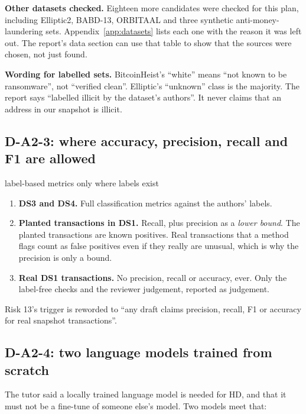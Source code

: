 \textbf{Other datasets checked.} Eighteen more candidates were checked for this plan, including
Elliptic2, BABD-13, ORBITAAL and three synthetic anti-money-laundering sets.
Appendix~\ref{app:datasets} lists each one with the reason it was left out. The report's data
section can use that table to show that the sources were chosen, not just found.

\textbf{Wording for labelled sets.} BitcoinHeist's ``white'' means ``not known to be ransomware'',
not ``verified clean''. Elliptic's ``unknown'' class is the majority. The report says ``labelled
illicit by the dataset's authors''. It never claims that an address in our snapshot is illicit.

\subsection{D-A2-3: where accuracy, precision, recall and F1 are allowed}
\label{sec:metricsrule}

\begin{decision}{label-based metrics only where labels exist}
\begin{enumerate}[leftmargin=*]
  \item \textbf{DS3 and DS4.} Full classification metrics against the authors' labels.
  \item \textbf{Planted transactions in DS1.} Recall, plus precision as a \emph{lower bound}. The
    planted transactions are known positives. Real transactions that a method flags count as
    false positives even if they really are unusual, which is why the precision is only a bound.
  \item \textbf{Real DS1 transactions.} No precision, recall or accuracy, ever. Only the
    label-free checks and the reviewer judgement, reported as judgement.
\end{enumerate}
Risk 13's trigger is reworded to ``any draft claims precision, recall, F1 or accuracy for real
snapshot transactions''.
\end{decision}

\subsection{D-A2-4: two language models trained from scratch}
\label{sec:lmdecision}

The tutor said a locally trained language model is needed for HD, and that it must not be a
fine-tune of someone else's model. Two models meet that:

